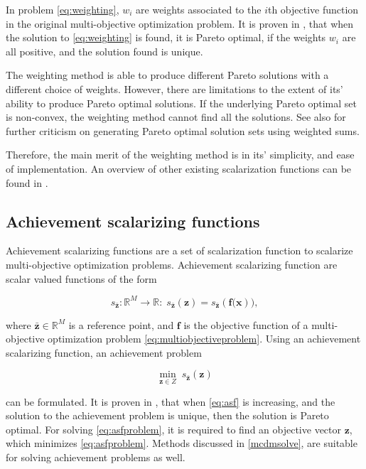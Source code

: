 In problem \eqref{eq:weighting}, $w_i$ are weights associated to the $i$th objective function in the original multi-objective optimization problem. It is proven in
\cite[chapter 3.1]{Miettinen1998}, that when the solution to \ref{eq:weighting} is found, it is Pareto optimal, if the weights $w_i$ are all positive, and the solution
found is unique.

The weighting method is able to produce different Pareto solutions with a different choice of weights. However, there are limitations to the extent of
its' ability to produce Pareto optimal solutions. If the underlying Pareto optimal set is non-convex, the weighting method cannot find all the
solutions\cite[chapter 3.1]{Miettinen1998}. See also \cite{Das1997} for further criticism on generating Pareto optimal solution sets using weighted
sums.

Therefore, the main merit of the weighting method is in its' simplicity, and ease of implementation.
An overview
of other existing scalarization functions can be found in \cite{Coello2017}.

\subsection{Achievement scalarizing functions}
\label{asf}
Achievement scalarizing functions are a set of scalarization function to scalarize multi-objective optimization problems. Achievement scalarizing function are
scalar valued functions of the form

\begin{equation}
    \label{eq:asf}
    s_{\mathbf{\bar{z}}}: \mathbb{R}^M \to \mathbb{R}:\;s_{\mathbf{\bar{z}}}(\mathbf{z}) = s_{\mathbf{\bar{z}}}(\mathbf{f(\mathbf{x}})),
\end{equation}

where $\mathbf{\bar{z}} \in \mathbb{R}^M$ is a reference point, and $\mathbf{f}$ is the objective function of a multi-objective optimization problem
\ref{eq:multiobjectiveproblem}. Using an achievement scalarizing function, an achievement problem

\begin{equation}
    \label{eq:asfproblem}
    \min_{\mathbf{z}\in Z}\; s_{\mathbf{\bar{z}}}(\mathbf{z})
\end{equation}

can be formulated. It is proven in \cite[chapter 3.5]{Miettinen1998}, that when \eqref{eq:asf} is increasing, and the solution to the achievement problem
is unique, then the solution is Pareto optimal. For solving \eqref{eq:asfproblem}, it is required to find an objective vector $\mathbf{z}$, which minimizes
\eqref{eq:asfproblem}. Methods discussed in \ref{mcdmsolve}, are suitable for solving achievement problems as well.

